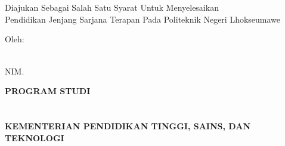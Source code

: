 \newpage
\thispagestyle{empty}
\begin{center}
    \begin{doublespace}
        \textbf{\large{\MakeUppercase{\judulid}}}\\[2.5cm]
    \end{doublespace}

    \textbf{\MakeUppercase{\large{\tipe}}}\\[0.5cm]
    \begin{onehalfspace}
        Diajukan Sebagai Salah Satu Syarat Untuk Menyelesaikan\\Pendidikan Jenjang Sarjana Terapan Pada Politeknik Negeri Lhokseumawe\\[2cm]
    \end{onehalfspace}

    \large Oleh: \\
    \begin{onehalfspace}
        \large\textbf{\MakeUppercase{\penulis}} \\
        \large NIM. \textbf{\nim}\\[2.5cm]
    \end{onehalfspace}

    \vfill

    \textbf{\large PROGRAM STUDI \MakeUppercase{\prodi}}\\
    \textbf{\large \MakeUppercase{\fakultas}}\\
    \textbf{\large \MakeUppercase{\universitas}}\\
    \textbf{\large KEMENTERIAN PENDIDIKAN TINGGI, SAINS, DAN TEKNOLOGI}\\
    \textbf{\large \MakeUppercase{\tahun}}\\
\end{center}
